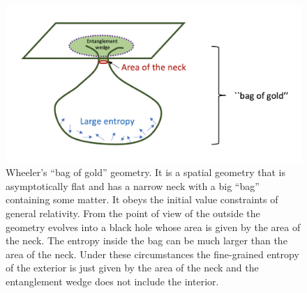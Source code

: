  \begin{figure}[ht]
\begin{center}
\includegraphics[scale=.35]{figures/BagGold}  
\caption{  Wheeler's ``bag of gold'' geometry. It is a spatial geometry that is asymptotically flat and has a narrow neck with a big ``bag'' containing some matter. It obeys the initial value constraints of general relativity. From the point of view of the outside the geometry evolves into a black hole whose area is given by the area of the neck. The entropy inside the bag can be much larger than the area of the neck. Under these circumstances the fine-grained entropy of the exterior is  just   given by the  area of the neck and the entanglement wedge does  not include the interior.  }
\label{BagGold}
\end{center}
\end{figure}

